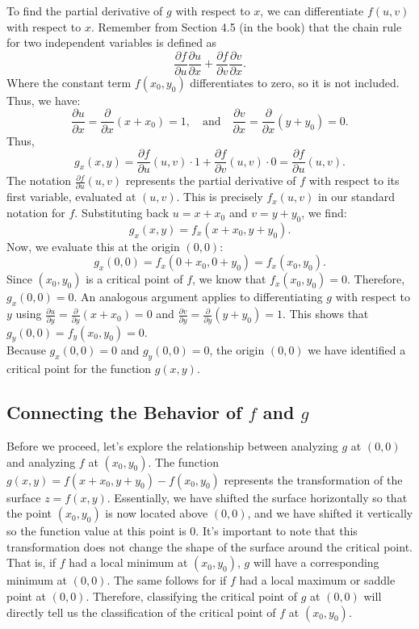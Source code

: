 \documentclass{article}
\newcommand{\mpfrac}[1]{\frac{\partial}{\partial #1}}
\newcommand{\bpfrac}[2]{\frac{\partial #1}{\partial #2}}
\begin{document}
To find the partial derivative of \( g \) with respect to \( x \), we can differentiate \( f(u,v) \) with respect to \( x \). Remember from Section 4.5 (in the book) that the chain rule for two independent variables is defined as 
\[
	\bpfrac{f}{u} \bpfrac{u}{x} + \bpfrac{f}{v} \bpfrac{v}{x}.
\]
Where the constant term \( f(x_0, y_0) \) differentiates to zero, so it is not included. Thus, we have:
\[
	\bpfrac{u}{x} = \mpfrac{x}(x + x_{0}) = 1, \quad \text{and} \quad \bpfrac{v}{x} = \mpfrac{x}(y + y_{0}) = 0.
\]
Thus,
\[
	g_{x}(x,y) = \bpfrac{f}{u}(u,v) \cdot 1 + \bpfrac{f}{v}(u,v) \cdot 0 = \bpfrac{f}{u}(u,v).
\]
The notation \( \bpfrac{f}{u}(u,v) \) represents the partial derivative of \( f \) with respect to its first variable, evaluated at \( (u,v) \). This is precisely \( f_{x}(u,v) \) in our standard notation for \( f \). Substituting back \( u = x + x_{0} \) and \( v = y + y_{0} \), we find:
\[
	g_{x}(x,y) = f_{x}(x + x_{0}, y + y_{0}).
\]
Now, we evaluate this at the origin \( (0,0) \):
\[
	g_{x}(0,0) = f_{x}(0 + x_{0}, 0 + y_{0}) = f_{x}(x_{0},y_{0}).
\]
Since \( (x_{0},y_{0}) \) is a critical point of \( f \), we know that \( f_{x}(x_{0},y_{0}) = 0 \). Therefore, \( g_{x}(0,0) = 0 \). An analogous argument applies to differentiating \( g \) with respect to \( y \) using \( \bpfrac{u}{y} = \mpfrac{y}(x + x_{0}) = 0 \) and \( \bpfrac{v}{y} = \mpfrac{y}(y + y_{0}) = 1 \). This shows that \( g_{y}(0,0) = f_{y}(x_{0},y_{0}) = 0 \). \\

Because \( g_{x}(0,0) = 0 \) and \( g_{y}(0,0) = 0 \), the origin \( (0,0) \) we have identified a critical point for the function \( g(x,y) \).

\subsection{Connecting the Behavior of \( f \) and \( g \)}

Before we proceed, let's explore the relationship between analyzing \( g \) at \( (0,0) \) and analyzing \( f \) at \( (x_{0},y_{0}) \). The function \( g(x,y) = f(x + x_{0}, y + y_{0}) - f(x_{0}, y_{0}) \) represents the transformation of the surface \( z=f(x,y) \). Essentially, we have shifted the surface horizontally so that the point \( (x_0, y_0) \) is now located above \( (0,0) \), and we have shifted it vertically so the function value at this point is 0. It's important to note that this transformation does not change the shape of the surface around the critical point. That is, if \( f \) had a local minimum at \( (x_0, y_0) \), \( g \) will have a corresponding minimum at \( (0,0) \). The same follows for if \( f \) had a local maximum or saddle point at \( (0,0) \). Therefore, classifying the critical point of \( g \) at \( (0,0) \) will directly tell us the classification of the critical point of \( f \) at \( (x_{0},y_{0}) \).
\end{document}
